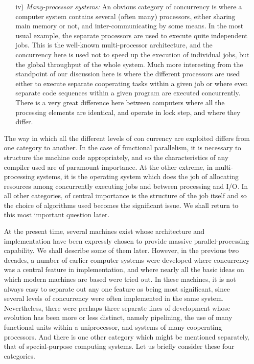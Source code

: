 \documentclass[a4paper,12pt]{article}
\begin{document}
\begin{itemize}
   \item[iv)] {\itshape Many-processor systems:} An obvious category
     of concurrency is where a computer system contains several
     (often many) processors, either sharing main memory or not, and
     inter-communicating by some means. In the most usual example,
     the separate processors are used to execute quite independent
     jobs. This is the well-known multi-processor architecture, and
     the concurrency here is used not to speed up the execution of
     individual jobs, but the global throughput of the whole system.
     \noindent Much more interesting from the standpoint of our discussion
     here is where the different processors are used either to
     execute separate cooperating tasks within a given job or where
     even separate code sequences within a given program are
     executed concurrently.
     \noindent There is a very great difference here between computers where
     all the processing elements are identical, and operate in lock
     step, and where they differ.
\end{itemize}

   The way in which all the different levels of con currency are
exploited differs from one category to another. In the case of
functional parallelism, it is necessary to structure the machine
code appropriately, and so the characteristics of any compiler used
are of paramount importance. At the other extreme, in
multi-processing systems, it is the operating system which does the
job of allocating resources among concurrently executing jobs and
between processing and I/O. In all other categories, of central
importance is the structure of the job itself and so the choice of
algorithms used becomes the significant issue. We shall return to
this most important question later.\par\medskip

   At the present time, several machines exist whose architecture and
implementation have been expressly chosen to provide massive
parallel-processing capability. We shall describe some of them
later. However, in the previous two decades, a number of earlier
computer systems were developed where concurrency was a central
feature in implementation, and where nearly all the basic ideas on
which modern machines are based were tried out. In these machines, it
is not always easy to separate out any one feature as being most
significant, since several levels of concurrency were often
implemented in the same system. Nevertheless, there were perhaps three
separate lines of development whose evolution has been more or less
distinct, namely pipelining, the use of many functional units within a
uniprocessor, and systems of many cooperating processors. And there is
one other category which might be mentioned separately, that of
special-purpose computing systems. Let us briefly consider these four
categories.
\end{document}
